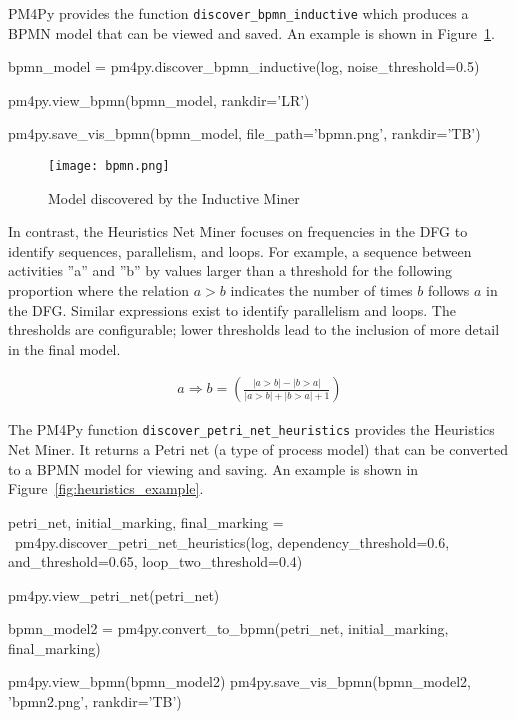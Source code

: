 PM4Py provides the function \texttt{discover\_bpmn\_inductive} which produces a BPMN model that can be viewed and saved. An example is shown in Figure~\ref{fig:inductive_example}.

\begin{samepage}
\begin{pythoncode}
bpmn_model = pm4py.discover_bpmn_inductive(log, noise_threshold=0.5)

pm4py.view_bpmn(bpmn_model, rankdir='LR')

pm4py.save_vis_bpmn(bpmn_model, file_path='bpmn.png', rankdir='TB')
\end{pythoncode}
\end{samepage}

\begin{figure}
\centering
\texttt{[image: bpmn.png]}
\caption{Model discovered by the Inductive Miner}
\label{fig:inductive_example}
\end{figure}

In contrast, the Heuristics Net Miner  focuses on frequencies in the DFG to identify sequences, parallelism, and loops. For example, a sequence between activities ''a'' and ''b'' by values larger than a threshold for the following proportion where the relation $a > b$ indicates the number of times $b$ follows $a$ in the DFG. Similar expressions exist to identify parallelism and loops. The thresholds are configurable; lower thresholds lead to the inclusion of more detail in the final model.

\begin{align*}
a \Rightarrow b = \left( \frac{
| a > b| - |b > a|}{
| a > b| + |b > a| + 1}\right)
\end{align*}
 
The PM4Py function \texttt{discover\_petri\_net\_heuristics} provides the Heuristics Net Miner. It returns a Petri net (a type of process model) that can be converted to a BPMN model for viewing and saving. An example is shown in Figure~\ref{fig:heuristics_example}.

\begin{samepage}
\begin{pythoncode}
petri_net, initial_marking, final_marking = \
    pm4py.discover_petri_net_heuristics(log, 
        dependency_threshold=0.6,
        and_threshold=0.65,
        loop_two_threshold=0.4)
        
pm4py.view_petri_net(petri_net)
        
bpmn_model2 = pm4py.convert_to_bpmn(petri_net, 
    initial_marking, final_marking)
    
pm4py.view_bpmn(bpmn_model2)
pm4py.save_vis_bpmn(bpmn_model2, 'bpmn2.png', rankdir='TB')
\end{pythoncode}
\end{samepage}

